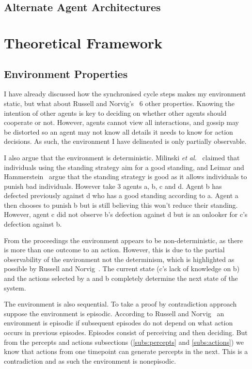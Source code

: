 \documentclass[]{final_report}
\begin{document}
\subsection{Alternate Agent Architectures}

\section{Theoretical Framework}
\subsection{Environment Properties}
\label{appendix:envprop}
I have already discussed how the synchronised cycle steps makes my environment static, but what about Russell and Norvig's~\cite{russell2016artificial} 6 other properties. Knowing the intention of other agents is key to deciding on whether other agents should cooperate or not. However, agents cannot view all interactions, and gossip may be distorted so an agent may not know all details it needs to know for action decisions. As such, the environment I have delineated is only partially observable.\par
I also argue that the environment is deterministic. Milinski \textit{et al.}~\cite{imagevsstanding} claimed that individuals using the standing strategy aim for a good standing, and Leimar and Hammerstein~\cite{leimarhammer} argue that the standing strategy is good as it allows individuals to punish bad individuals. However take 3 agents a, b, c and d. Agent b has defected previously against d who has a good standing according to a. Agent a then chooses to punish b but is still believing this won't reduce their standing. However, agent c did not observe b's defection against d but is an onlooker for c's defection against b.\par
From the proceedings the environment appears to be non-deterministic, as there is more than one outcome to an action. However, this is due to the partial observability of the environment not the determinism, which is highlighted as possible by Russell and Norvig~\cite{russell2016artificial}. The current state (c's lack of knowledge on b) and the actions selected by a and b completely determine the next state of the system.\par
The environment is also sequential. To take a proof by contradiction approach suppose the environment is episodic. According to Russell and Norvig~\cite{russell2016artificial} an environment is episodic if subsequent episodes do not depend on what action occurs in previous episodes. Episodes consist of perceiving and then deciding. But from the percepts and actions subsections (\ref{subs:percepts} and \ref{subs:actions}) we know that actions from one timepoint can generate percepts in the next. This is a contradiction and as such the environment is nonepisodic.\par
\end{document}
